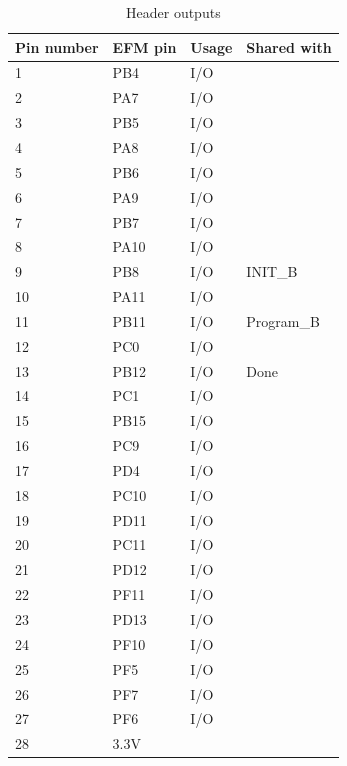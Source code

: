 \begin{table}[]
    \centering
    \begin{tabular}{llll}
        Pin number & EFM pin & Usage & Shared with \\
        \hline
        1       & PB4     & I/O   &             \\
        2       & PA7     & I/O   &             \\
        3       & PB5     & I/O   &             \\
        4       & PA8     & I/O   &             \\
        5       & PB6     & I/O   &             \\
        6       & PA9     & I/O   &             \\
        7       & PB7     & I/O   &             \\
        8       & PA10    & I/O   &             \\
        9       & PB8     & I/O   & INIT\_B     \\
        10      & PA11    & I/O   &             \\
        11      & PB11    & I/O   & Program\_B  \\
        12      & PC0     & I/O   &             \\
        13      & PB12    & I/O   & Done        \\
        14      & PC1     & I/O   &             \\
        15      & PB15    & I/O   &             \\
        16      & PC9     & I/O   &             \\
        17      & PD4     & I/O   &             \\
        18      & PC10    & I/O   &             \\
        19      & PD11    & I/O   &             \\
        20      & PC11    & I/O   &             \\
        21      & PD12    & I/O   &             \\
        22      & PF11    & I/O   &             \\
        23      & PD13    & I/O   &             \\
        24      & PF10    & I/O   &             \\
        25      & PF5     & I/O   &             \\
        26      & PF7     & I/O   &             \\
        27      & PF6     & I/O   &             \\
        28      & 3.3V    &       &
    \end{tabular}
    \caption{Header outputs}
    \label{tab:HeaderOut}
\end{table}

